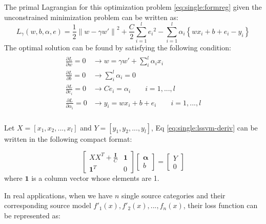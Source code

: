 The primal Lagrangian for this optimization problem \ref{eq:single:formreg} given the unconstrained minimization problem can be written as: 
\begin{equation}
	{L_\gamma }\left( {w,b,\alpha ,e} \right) = \frac{1}{2}{\left\| {w - \gamma w'} \right\|^2} + \frac{C}{2}\sum\limits_{i = 1}^l {{e _i}^2}  - \sum\limits_{i = 1}^l {{\alpha _i}\left\{ {w{x_i} + b + {e_i} - {y_i}} \right\}} 
\end{equation}
The optimal solution can be found by satisfying the following condition:
\begin{eqnarray}\label{eq:single:lssvm-deriv}
\begin{aligned}
\frac{{\partial L}}{{\partial w}} = 0 &\to w = \gamma w' + \sum\limits_i^l {{\alpha _i}{x_i}} \\
\frac{{\partial L}}{{\partial b}} = 0 &\to \sum\limits_i^l {{\alpha _i} = 0} \\
\frac{{\partial L}}{{\partial e_i}} = 0 &\to C{e_i} = {\alpha _i} \qquad i = 1,...,l\\
\frac{{\partial L}}{{\partial {\alpha _i}}} = 0 &\to {y_i} = {w} {{x_i}} + b + {e _i}\qquad i = 1,...,l\\
\end{aligned}
\end{eqnarray}

Let $X=\left[x_1,x_2,...,x_l\right]$ and $Y=[y_1,y_2,...,y_l]$, Eq \eqref{eq:single:lssvm-deriv} can be written in the following compact format:

\begin{equation}\label{eq:single:matrixsolve}
	\left[\begin{array}{cc}
	XX^T+\frac{\mathbf{I}}{C}&\mathbf{1}\\
	\mathbf{1}^T&0
	\end{array}\right]\left[\begin{array}{c} \mathbf{\alpha}\\b
	\end{array}\right] = \left[\begin{array}{c} Y\\0
	\end{array}\right]
\end{equation} 
where $\mathbf{1}$ is a column  vector whose elements are 1. 

In real applications, when we have $n$ single source categories and their corresponding source model $f'_1(x),f'_2(x),...,f_n(x)$, their loss function can be represented as:

